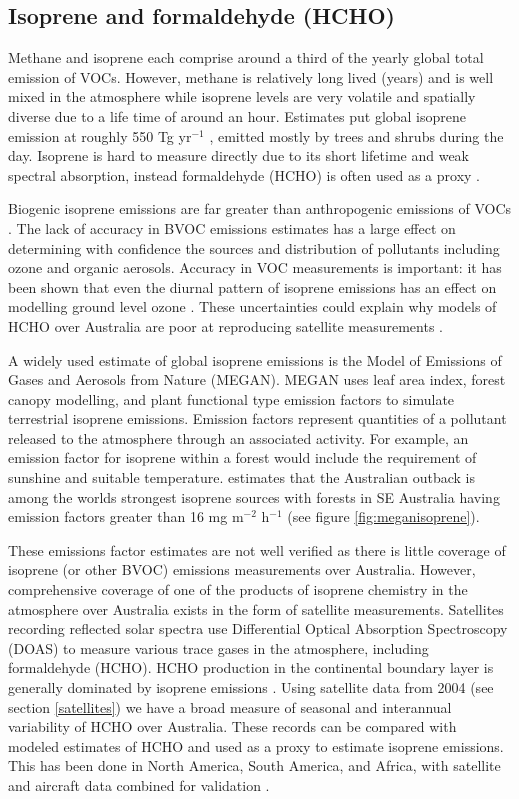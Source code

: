 \subsection{Isoprene and formaldehyde (HCHO)}
\label{proxy}
Methane and isoprene each comprise around a third of the yearly global total emission of VOCs.
However, methane is relatively long lived (years) and is well mixed in the atmosphere while isoprene levels are very volatile and spatially diverse due to a life time of around an hour. Estimates put global isoprene emission at roughly 550 Tg yr$^{−1}$ \cite{Guenther_2006,Monks_2014}, emitted mostly by trees and shrubs during the day.
Isoprene is hard to measure directly due to its short lifetime and weak spectral absorption, instead formaldehyde (HCHO) is often used as a proxy \cite{Marais_2012,bauwens2013satellite}.

Biogenic isoprene emissions are far greater than anthropogenic emissions of VOCs \cite{Guenther_2006}. 
The lack of accuracy in BVOC emissions estimates has a large effect on determining with confidence the sources and distribution of pollutants including ozone and organic aerosols.
Accuracy in VOC measurements is important: it has been shown that even the diurnal pattern of isoprene emissions has an effect on modelling ground level ozone \cite{Hewitt_2011,Fan_2004}.
These uncertainties could explain why models of HCHO over Australia are poor at reproducing satellite measurements \cite{Stavrakou_2008}.

A widely used estimate of global isoprene emissions is the Model of Emissions of Gases and Aerosols from Nature (MEGAN). MEGAN uses leaf area index, forest canopy modelling, and plant functional type emission factors to simulate terrestrial isoprene emissions.
Emission factors represent quantities of a pollutant released to the atmosphere through an associated activity.
For example, an emission factor for isoprene within a forest would include the requirement of sunshine and suitable temperature.
\citet{Guenther_2006} estimates that the Australian outback is among the worlds strongest isoprene sources with forests in SE Australia having emission factors greater than 16 mg m$^{-2}$ h$^{-1}$ (see figure \ref{fig:meganisoprene}).

These emissions factor estimates are not well verified as there is little coverage of isoprene (or other BVOC) emissions measurements over Australia. However, comprehensive coverage of one of the products of isoprene chemistry in the atmosphere over Australia exists in the form of satellite measurements. 
Satellites recording reflected solar spectra use Differential Optical Absorption Spectroscopy (DOAS) to measure various trace gases in the atmosphere, including formaldehyde (HCHO). HCHO production in the continental boundary layer is generally dominated by isoprene emissions \cite{Kefauver_2014}.
Using satellite data from 2004 (see section \ref{satellites}) we have a broad measure of seasonal and interannual variability of HCHO over Australia. These records can be compared with modeled estimates of HCHO and used as a proxy to estimate isoprene emissions. This has been done in North America, South America, and Africa, with satellite and aircraft data combined for validation \cite{Millet_2006, Marais_2014}.

